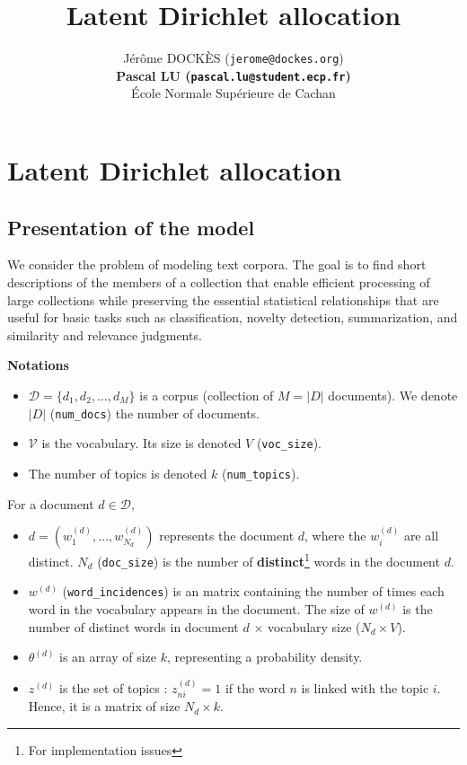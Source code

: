 \documentclass{article}
\title{Latent Dirichlet allocation}
\author{
J\'er\^ome DOCK\`ES (\texttt{jerome@dockes.org}) \\
\textbf{Pascal LU (\texttt{pascal.lu@student.ecp.fr})} \\
\'Ecole Normale Sup\'erieure de Cachan \\
}
\begin{document}
\maketitle

\section{Latent Dirichlet allocation}
\subsection{Presentation of the model}

We consider the problem of modeling text corpora. The goal is to find short descriptions of the members of a collection that enable efficient processing of large collections while preserving the essential statistical relationships that are useful for basic tasks such as classification, novelty detection, summarization, and similarity and relevance judgments.

\medskip

\textbf{Notations}
\begin{itemize}
\setlength\itemsep{-0.2em}
  \item $\mathcal{D} = \{d_{1},d_{2}, \ldots, d_{M}\}$ is a corpus (collection of $M=|D|$ documents). We denote $|D|$ (\verb"num_docs") the number of documents.
  \item $\mathcal{V}$ is the vocabulary. Its size is denoted $V$ (\verb"voc_size").
  \item The number of topics is denoted $k$ (\verb"num_topics").
\end{itemize}

For a document $d \in \mathcal{D}$,
\begin{itemize}  
\setlength\itemsep{-0.2em}
  \item $d = (w_1^{(d)}, \ldots, w_{N_d}^{(d)})$ represents the document $d$, where the $w_i^{(d)}$ are all distinct. $N_d$ (\verb"doc_size") is the number of \textbf{distinct}\footnote{For implementation issues} words in the document $d$.
  \item $w^{(d)}$ (\verb"word_incidences") is an matrix containing the number of times each word in the vocabulary appears in the document. The size of $w^{(d)}$ is the number of distinct words in document $d$ $\times$ vocabulary size ($N_d \times V$).
 \item $\theta^{(d)}$ is an array of size $k$, representing a probability density.
 \item $z^{(d)}$ is the set of topics : $z_{ni}^{(d)} =  1$ if the word $n$ is linked with the topic $i$. Hence, it is a matrix of size $N_d \times k$.
\end{itemize}
\end{document}
